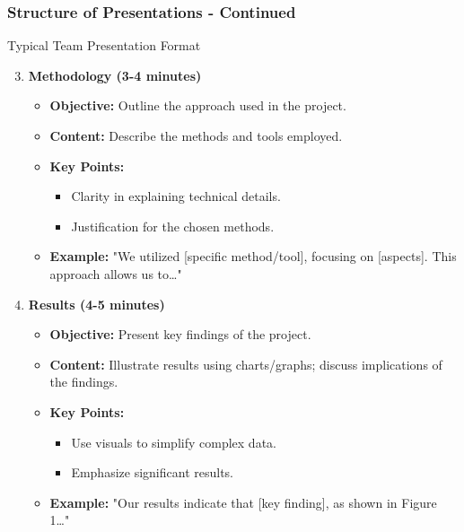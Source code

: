 \documentclass{beamer}
\begin{document}
\begin{frame}[fragile]
    \frametitle{Structure of Presentations - Continued}
    \begin{block}{Typical Team Presentation Format}
        \begin{enumerate}
            \setcounter{enumi}{2} %
            \item \textbf{Methodology (3-4 minutes)}
                \begin{itemize}
                    \item \textbf{Objective:} Outline the approach used in the project.
                    \item \textbf{Content:} Describe the methods and tools employed.
                    \item \textbf{Key Points:}
                        \begin{itemize}
                            \item Clarity in explaining technical details.
                            \item Justification for the chosen methods.
                        \end{itemize}
                    \item \textbf{Example:} "We utilized [specific method/tool], focusing on [aspects]. This approach allows us to…"
                \end{itemize}

            \item \textbf{Results (4-5 minutes)}
                \begin{itemize}
                    \item \textbf{Objective:} Present key findings of the project.
                    \item \textbf{Content:} Illustrate results using charts/graphs; discuss implications of the findings.
                    \item \textbf{Key Points:}
                        \begin{itemize}
                            \item Use visuals to simplify complex data.
                            \item Emphasize significant results.
                        \end{itemize}
                    \item \textbf{Example:} "Our results indicate that [key finding], as shown in Figure 1…"
                \end{itemize}
        \end{enumerate}
    \end{block}
\end{frame}
\end{document}
